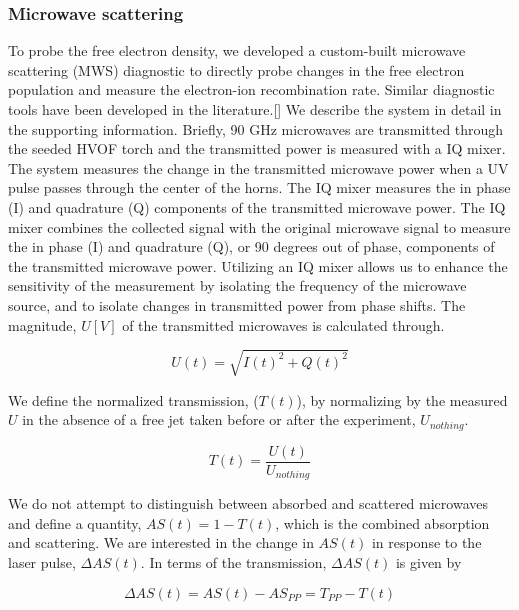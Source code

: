 \subsubsection{Microwave scattering}

To probe the free electron density, we developed a custom-built microwave scattering (MWS) diagnostic to directly probe changes in the free electron population and measure the electron-ion recombination rate. Similar diagnostic tools have been developed in the literature.[]  We describe the system in detail in the supporting information. Briefly, 90 GHz microwaves are transmitted through the seeded HVOF torch and the transmitted power is measured with a IQ mixer. The system measures the change in the transmitted microwave power when a UV pulse passes through the center of the horns.  The IQ mixer measures the in phase (I) and quadrature (Q) components of the transmitted microwave power. The IQ mixer combines the collected signal with the original microwave signal to measure the in phase (I) and quadrature (Q), or 90 degrees out of phase, components of the transmitted microwave power. Utilizing an IQ mixer allows us to enhance the sensitivity of the measurement by isolating the frequency of the microwave source, and to isolate changes in transmitted power from phase shifts. The magnitude, $U [V]$ of the transmitted microwaves is calculated through.

\begin{equation}
    U(t) = \sqrt{I(t)^2 + Q(t)^2}
\end{equation}

We define the normalized transmission, ($T(t)$), by normalizing by the measured $U$ in the absence of a free jet taken before or after the experiment, $U_{nothing}$. 

\begin{equation}
    \label{eq:transmission_def}
    T(t) = \frac{U(t)}{U_{nothing}}
\end{equation}

We do not attempt to distinguish between absorbed and scattered microwaves and define a quantity, $AS(t) = 1- T(t)$, which is the combined absorption and scattering. We are interested in the change in $AS(t)$ in response to the laser pulse, $\Delta AS(t)$. In terms of the transmission, $\Delta AS(t)$ is given by

\begin{equation}
    \Delta AS(t) = AS(t) - AS_{PP} =  T_{PP} - T(t)
\end{equation}


